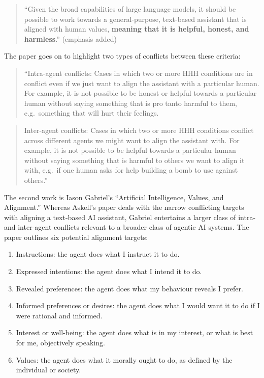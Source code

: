 \documentclass[letterpaper]{article} %
\begin{document}
\begin{quote}
``Given the broad capabilities of large language models, it should be possible to work towards a general-purpose, text-based assistant that is aligned with human values, \textbf{meaning that it is helpful, honest, and harmless}.'' (emphasis added)
\end{quote}

The paper goes on to highlight two types of conflicts between these criteria:

\begin{quote}
``Intra-agent conflicts: Cases in which two or more HHH conditions are in conflict even if we just want to align the assistant with a particular human. For example, it is not possible to be honest or helpful towards a particular human without saying something that is pro tanto harmful to them, e.g.~something that will hurt their feelings.
\end{quote}

\begin{quote}
Inter-agent conflicts: Cases in which two or more HHH conditions conflict across different agents we might want to align the assistant with. For example, it is not possible to be helpful towards a particular human without saying something that is harmful to others we want to align it with, e.g.~if one human asks for help building a bomb to use against others.''
\end{quote}

The second work is Iason Gabriel's \citeyearpar{gabriel_values} ``Artificial Intelligence, Values, and Alignment.'' Whereas Askell's paper deals with the narrow conflicting targets with aligning a text-based AI assistant, Gabriel entertains a larger class of intra- and inter-agent conflicts relevant to a broader class of agentic AI systems. The paper outlines six potential alignment targets:

\begin{enumerate}
\def\labelenumi{\arabic{enumi}.}
\item
  Instructions: the agent does what I instruct it to do.
\item
  Expressed intentions: the agent does what I intend it to do.
\item
  Revealed preferences: the agent does what my behaviour reveals I prefer.
\item
  Informed preferences or desires: the agent does what I would want it to do if I were rational and informed.
\item
  Interest or well-being: the agent does what is in my interest, or what is best for me, objectively speaking.
\item
  Values: the agent does what it morally ought to do, as defined by the individual or society.
\end{enumerate}
\end{document}
